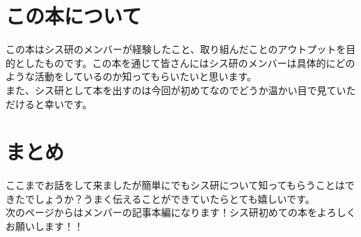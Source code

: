 \section{この本について}
この本はシス研のメンバーが経験したこと、取り組んだことのアウトプットを目的としたものです。この本を通じて皆さんにはシス研のメンバーは具体的にどのような活動をしているのか知ってもらいたいと思います。 \\
また、シス研として本を出すのは今回が初めてなのでどうか温かい目で見ていただけると幸いです。

\section{まとめ}
ここまでお話をして来ましたが簡単にでもシス研について知ってもらうことはできたでしょうか？うまく伝えることができていたらとても嬉しいです。 \\
次のページからはメンバーの記事本編になります！シス研初めての本をよろしくお願いします！！